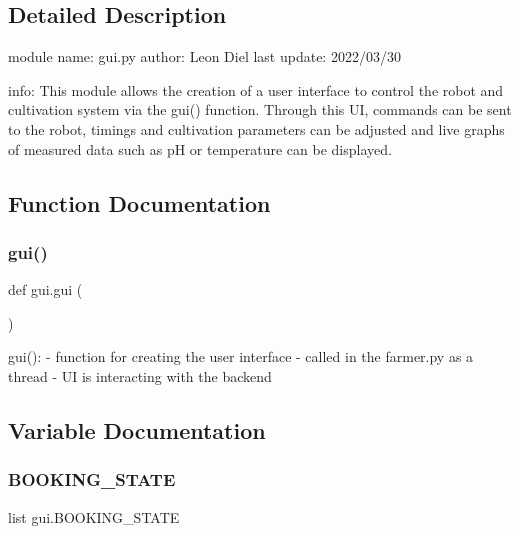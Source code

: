 \subsection{Detailed Description}
\begin{DoxyVerb}module name: gui.py
author:      Leon Diel
last update: 2022/03/30

info:
    This module allows the creation of a user interface to control the robot and cultivation system via the gui() function. 
    Through this UI, commands can be sent to the robot, timings and cultivation parameters can be adjusted and live graphs of measured data such as pH or temperature can be displayed.
\end{DoxyVerb}
 

\subsection{Function Documentation}
\mbox{\label{namespacegui_a2ff258a53db853fc799c84dcda97617d_a2ff258a53db853fc799c84dcda97617d}} 
\subsubsection{\texorpdfstring{gui()}{gui()}}
{\footnotesize\ttfamily def gui.\+gui (\begin{DoxyParamCaption}{ }\end{DoxyParamCaption})}

\begin{DoxyVerb}gui():
    - function for creating the user interface
    - called in the farmer.py as a thread
    - UI is interacting with the backend
\end{DoxyVerb}
 

\subsection{Variable Documentation}
\mbox{\label{namespacegui_a895d90d554452e07413b5f626f07c13d_a895d90d554452e07413b5f626f07c13d}} 
\subsubsection{\texorpdfstring{B\+O\+O\+K\+I\+N\+G\+\_\+\+S\+T\+A\+TE}{BOOKING\_STATE}}
{\footnotesize\ttfamily list gui.\+B\+O\+O\+K\+I\+N\+G\+\_\+\+S\+T\+A\+TE}

